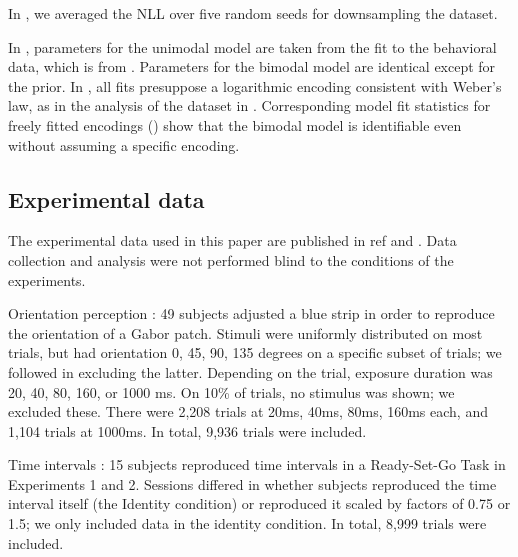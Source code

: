 %
In , we averaged the NLL over five random seeds for downsampling the dataset.



%
In , parameters for the unimodal model are taken from the fit to the behavioral data, which is from \cite{hahn2024unifying}. Parameters for the bimodal model are identical except for the prior.
%
In , all fits presuppose a logarithmic encoding consistent with Weber's law, as in the analysis of the dataset in \cite{hahn2024unifying}. Corresponding model fit statistics for freely fitted encodings () show that the bimodal model is identifiable even without assuming a specific encoding.

\subsection*{Experimental data} The experimental data used in this paper are published in ref \cite{deGardelle2010AnOI} and \cite{Remington2018LateBI}. Data collection and analysis were not performed blind to the conditions of the experiments.

%
Orientation perception \citep{deGardelle2010AnOI}: 49 subjects adjusted a blue strip in order to reproduce the orientation of a Gabor patch.
Stimuli were uniformly distributed on most trials, but had orientation 0, 45, 90, 135 degrees on a specific subset of trials; we followed \cite{hahn2024unifying} in excluding the latter.
Depending on the trial, exposure duration was 20, 40, 80, 160, or 1000 ms.
On 10\% of trials, no stimulus was shown; we excluded these.
There were 2,208 trials at 20ms,  40ms, 80ms, 160ms each, and 1,104 trials at 1000ms. In total, 9,936 trials were included.



Time intervals \citep{Remington2018LateBI}: 15 subjects reproduced time intervals in a Ready-Set-Go Task in Experiments 1 and 2.
Sessions differed in whether subjects reproduced the time interval itself (the Identity condition)  or reproduced it scaled by factors of 0.75 or 1.5; we only included data in the identity condition.  In total, 8,999 trials were included.


